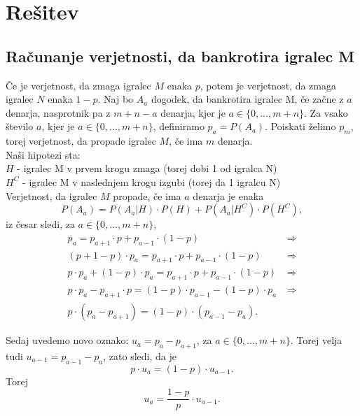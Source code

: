 \documentclass[12pt, a4paper]{article}
\begin{document}
\newpage

\section[Rešitev]{Rešitev}
\subsection{Računanje verjetnosti, da bankrotira igralec M}

Če je verjetnost, da zmaga igralec $M$ enaka $p$, potem je verjetnost, da zmaga igralec $N$ enaka $1-p$. Naj bo $A_a$ dogodek, da bankrotira igralec M, če začne z $a$ denarja, nasprotnik pa z $m + n - a$ denarja, kjer je $ a \in \{ 0, \dotso , m + n\}$. Za vsako število $a$, kjer je $ a \in \{ 0, \dotso , m + n\}$,  definiramo $p_a = P(A_a)$.
Poiskati želimo $p_m$, torej verjetnost, da propade igralec $M$, če ima $m$ denarja. 
\\

Naši hipotezi sta:
\\
$H$ - igralec M v prvem krogu zmaga (torej dobi 1 od igralca N)
\\
$H^C$ - igralec M v naslednjem krogu izgubi (torej da 1 igralcu N)
\\

Verjetnost, da igralec $M$ propade, če ima $a$ denarja je enaka
\\
$$P(A_a) = P(A_a \vert  H) \cdot P(H) + P(A_a \vert  H^C) \cdot P(H^C),$$
 iz česar sledi, za $ a \in \{ 0, \dotso , m + n\}$,
\begin{equation*}
\begin{split}
p_a = p_{a+1} \cdot p + p_{a-1} \cdot (1 - p) &~ \Rightarrow \\
(p + 1 -p) \cdot p_a = p_{a+1} \cdot p + p_{a-1} \cdot (1 - p) &~ \Rightarrow \\
 p \cdot p_a + (1 - p) \cdot p_a = p_{a+1} \cdot p + p_{a-1} \cdot (1 - p) &~ \Rightarrow \\
p \cdot p_a - p_{a+1} \cdot p = (1 - p) \cdot  p_{a-1} - (1-p) \cdot p_a &~ \Rightarrow \\
p \cdot (p_a - p_{a+1}) = (1-p) \cdot (p_{a-1} - p_a). &~
\end{split}
\end{equation*}


Sedaj uvedemo novo oznako: $u_a = p_a - p_{a+1}$, za  $ a \in \{ 0, \dotso , m + n\}$. Torej velja tudi $u_{a-1} = p_{a-1} - p_a$, zato sledi, da je
$$p \cdot u_a = (1 - p) \cdot u_{a-1}.$$
Torej $$u_a = \frac{1-p}{p} \cdot u_{a-1}.$$
\end{document}
